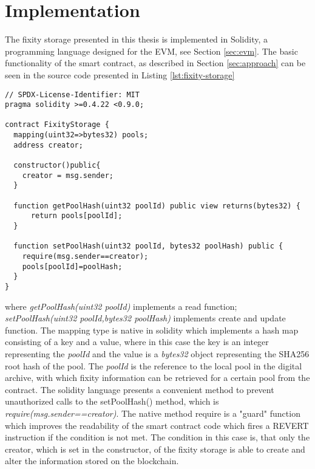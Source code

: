 \section{Implementation}
\label{sec:implementation}
The fixity storage presented in this thesis is implemented in Solidity, a programming language designed for the EVM, see Section \ref{sec:evm}.
The basic functionality of the smart contract, as described in Section \ref{sec:approach} can be seen in the source code presented in Listing \ref{lst:fixity-storage}
\begin{lstlisting}[language=Solidity,caption={MVP source code of the fixity storage deployed on the Ropsten test network \url{https://Ropsten.etherscan.io/address/0x0243c7aa552730E8C6F7ED25A480a7C0c88a70f0},label={lst:fixity-storage}}]
// SPDX-License-Identifier: MIT
pragma solidity >=0.4.22 <0.9.0;

contract FixityStorage {
  mapping(uint32=>bytes32) pools;
  address creator;

  constructor()public{
    creator = msg.sender;
  }

  function getPoolHash(uint32 poolId) public view returns(bytes32) {
      return pools[poolId];
  }

  function setPoolHash(uint32 poolId, bytes32 poolHash) public {
    require(msg.sender==creator);
    pools[poolId]=poolHash;
  }
}
\end{lstlisting}
where \textit{getPoolHash(uint32 poolId)} implements a read function; \textit{setPoolHash(uint32 poolId,bytes32 poolHash)} implements create and update function. The mapping type is native in solidity which implements a hash map consisting of a key and a value, where in this case the key is an integer representing the \textit{poolId} and the value is a \textit{bytes32} object representing the SHA256 root hash of the pool. The \textit{poolId} is the reference to the local pool in the digital archive, with which fixity information can be retrieved for a certain pool from the contract. The solidity language presents a convenient  method to prevent unauthorized calls to the setPoolHash() method, which is \textit{require(msg.sender==creator)}. The native method require is a "guard" function which improves the readability of the smart contract code which fires a REVERT instruction if the condition is not met. The condition in this case is, that only the creator, which is set in the constructor, of the fixity storage is able to create and alter the information stored on the blockchain.

